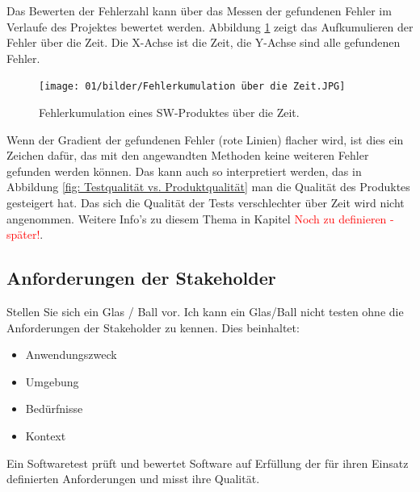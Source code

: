 Das Bewerten der Fehlerzahl kann über das Messen der gefundenen Fehler im Verlaufe des Projektes bewertet werden. Abbildung \ref{fig: Fehlerkumulation über die Zeit} zeigt das Aufkumulieren der Fehler über die Zeit. Die X-Achse ist die Zeit, die Y-Achse sind alle gefundenen Fehler.

\begin{figure}[H]
	\centering
	\texttt{[image: 01/bilder/Fehlerkumulation über die Zeit.JPG]}
	\caption{Fehlerkumulation eines SW-Produktes über die Zeit.}
	\label{fig: Fehlerkumulation über die Zeit}
\end{figure}

Wenn der Gradient der gefundenen Fehler (rote Linien) flacher wird, ist dies ein Zeichen dafür, das mit den angewandten Methoden keine weiteren Fehler gefunden werden können. Das kann auch so interpretiert werden, das in Abbildung \ref{fig: Testqualität vs. Produktqualität} man die Qualität des Produktes gesteigert hat. Das sich die Qualität der Tests verschlechter über Zeit wird nicht angenommen.
Weitere Info's zu diesem Thema in Kapitel \textcolor{red}{Noch zu definieren - später!}.


\subsection{Anforderungen der Stakeholder}
Stellen Sie sich ein Glas / Ball vor. Ich kann ein Glas/Ball nicht testen ohne die Anforderungen der Stakeholder zu kennen. Dies beinhaltet:
\begin{itemize}
    \item Anwendungszweck
    \item Umgebung
    \item Bedürfnisse
    \item Kontext
\end{itemize}

Ein Softwaretest prüft und bewertet Software auf Erfüllung der für ihren Einsatz definierten Anforderungen und misst ihre Qualität. 
